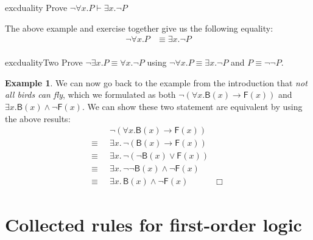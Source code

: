 \documentclass{article}
\theoremstyle{definition}
\newtheorem{example}{Example}
\newcommand{\rel}[1]{\mathsf{#1}}
\begin{document}
\begin{restatable}{exc}{duality}
  Prove $\neg \forall x . P \vdash \exists x . \neg P$
\end{restatable}
%
The above example and exercise together give us the following equality:
%
\begin{align*}
 \neg \forall x . P & \equiv \exists x . \neg P \\
\end{align*}
%
\begin{restatable}{exc}{dualityTwo}
  Prove $\neg \exists x . P \equiv \forall x . \neg P$ using
  $\neg \forall x . P \equiv \exists x . \neg P$ and $P \equiv
  \neg\neg P$.
\end{restatable}
%
\begin{example}
We can now go back to the example from the introduction
that \emph{not all birds can fly}, which we formulated as both
$\neg (\forall x . \rel{B}(x) \rightarrow \rel{F}(x))$ and
$\exists x . \rel{B}(x) \wedge \neg \rel{F}(x)$. We can show these
two statement are equivalent by using the above results:
%
\begin{align*}
    & \neg (\forall x . \rel{B}(x) \rightarrow \rel{F}(x)) \\
  \equiv \;\; &  \exists x . \, \neg (\rel{B}(x) \rightarrow \rel{F}(x)) \\
  \equiv \;\; & \exists x . \,\neg (\neg \rel{B}(x) \vee \rel{F}(x)) \\
  \equiv \;\; & \exists x . \,\neg \neg \rel{B}(x) \wedge \neg \rel{F}(x) \\
  \equiv \;\; & \exists x . \,\rel{B}(x) \wedge \neg \rel{F}(x) \qquad\quad \Box
\end{align*}
\end{example}




\section{Collected rules for first-order logic}

\vspace{2em}
\end{document}
